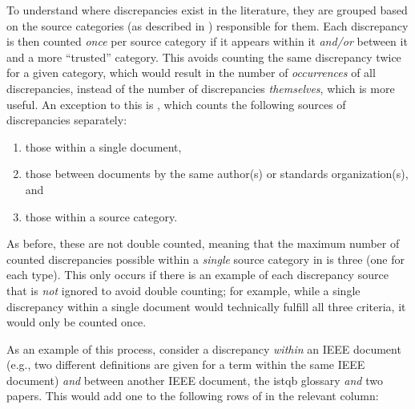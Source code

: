 To understand where discrepancies exist in the literature, they are
grouped based on the source categories (as described in )
responsible for them. Each discrepancy is then counted \emph{once} per source
category if it appears within it \emph{and/or} between it and a more
``trusted'' category. This avoids counting the same discrepancy twice for a
given category, which would result in the number of
\emph{occurrences} of all discrepancies, instead of the number of discrepancies
\emph{themselves}, which is more useful. An exception to this is
, which counts the following sources of discrepancies
separately:
\begin{enumerate}
    \item those within a single document,
    \item those between documents by the same author(s) or standards
          organization(s), and
    \item those within a source category.
\end{enumerate}
As before, these are not double counted, meaning that the maximum number of
counted discrepancies possible within a \emph{single} source category in
 is three (one for each type). This only occurs if
there is an example of each discrepancy source that is \emph{not} ignored to
avoid double counting; for example, while a single discrepancy within a single
document would technically fulfill all three criteria, it would only be counted
once.

\label{discrep-analysis-example}
As an example of this process, consider a discrepancy \emph{within} an IEEE
document (e.g., two different definitions are given for a term within the same
IEEE document) \emph{and} between another IEEE document, the \acs{istqb}
glossary \emph{and} two papers. This would add one to the following rows of
 in the relevant column:

